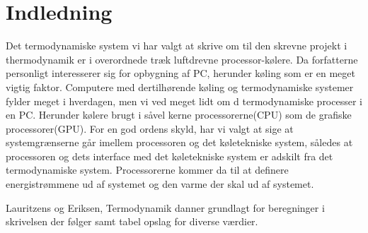 \section{Indledning}

Det termodynamiske system vi har valgt at skrive om til den skrevne projekt i thermodynamik er i overordnede træk luftdrevne processor-kølere. 
Da forfatterne personligt interesserer sig for opbygning af PC, herunder køling som er en meget vigtig faktor.
Computere med dertilhørende køling og termodynamiske systemer fylder meget i hverdagen, men vi ved meget lidt om d termodynamiske processer i en PC.
Herunder kølere brugt i såvel kerne processorerne(CPU) som de grafiske processorer(GPU). For en god ordens skyld, har vi valgt at sige at systemgrænserne går imellem processoren og det køletekniske system, således at processoren og dets interface med det køletekniske system er adskilt fra det termodynamiske system.
Processorerne kommer da til at definere energistrømmene ud af systemet og den varme der skal ud af systemet.

Lauritzens og Eriksen, Termodynamik danner grundlagt for beregninger i skrivelsen der følger samt tabel opslag for diverse værdier. 
